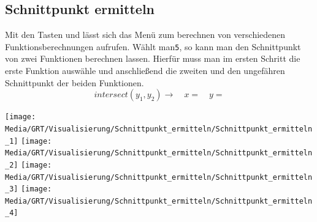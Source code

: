 \subsection{Schnittpunkt ermitteln}

\begin{paracol}{2}
\begin{flushleft}
	Mit den Tasten  und  lässt sich das Menü zum berechnen von verschiedenen Funktionsberechnungen aufrufen. Wählt man\texttt{5}, so kann man den Schnittpunkt von zwei Funktionen berechnen lassen. Hierfür muss man im ersten Schritt die erste Funktion auswähle und anschließend die zweiten und den ungefähren Schnittpunkt der beiden Funktionen.
	\[intersect(y_1,y_2)\rightarrow \quad x=\quad y=\]
	
\end{flushleft}
\switchcolumn
\begin{flushright}
	\texttt{[image: Media/GRT/Visualisierung/Schnittpunkt\_ermitteln/Schnittpunkt\_ermitteln\_1]}
	\texttt{[image: Media/GRT/Visualisierung/Schnittpunkt\_ermitteln/Schnittpunkt\_ermitteln\_2]}
	\texttt{[image: Media/GRT/Visualisierung/Schnittpunkt\_ermitteln/Schnittpunkt\_ermitteln\_3]}
	\texttt{[image: Media/GRT/Visualisierung/Schnittpunkt\_ermitteln/Schnittpunkt\_ermitteln\_4]}
	
	
\end{flushright}
\end{paracol}
